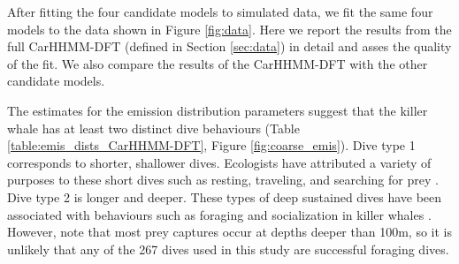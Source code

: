 



After fitting the four candidate models to simulated data, we fit the same four models to the data shown in Figure \ref{fig:data}. Here we report the results from the full CarHHMM-DFT (defined in Section \ref{sec:data}) in detail and asses the quality of the fit. We also compare the results of the CarHHMM-DFT with the other candidate models.

The estimates for the emission distribution parameters suggest that the killer whale has at least two distinct dive behaviours (Table \ref{table:emis_dists_CarHHMM-DFT}, Figure \ref{fig:coarse_emis}). 
Dive type 1 corresponds to shorter, shallower dives. Ecologists have attributed a variety of purposes to these short dives such as resting, traveling, and searching for prey \citep{Tennessen:2019a}.
Dive type 2 is longer and deeper. These types of deep sustained dives have been associated with behaviours such as foraging and socialization in killer whales \citep{Tennessen:2019a,Tennessen:2019b}. However, \citet{Wright:2017} note that most prey captures occur at depths deeper than 100m, so it is unlikely that any of the 267 dives used in this study are successful foraging dives.

